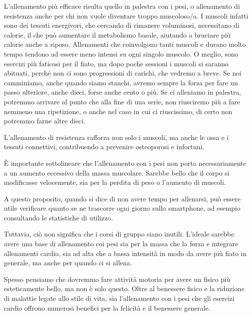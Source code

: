 \documentclass[12pt]{book} %
\begin{document}
\begin{itemize}
L'allenamento più efficace risulta quello in palestra con i pesi, o allenamento di resistenza anche per chi non vuole diventare troppo muscoloso/a.
I muscoli infatti sono dei tessuti energivori, che cercando di rimanere voluminosi, necessitano di calorie, il che può aumentare il metabolismo basale, aiutando a bruciare più calorie anche a riposo.
Allenamenti che coinvolgono tanti muscoli e durano molto tempo tendono ad essere meno intensi su ogni singolo muscolo. O meglio, sono esercizi più faticosi per il fiato, ma dopo poche sessioni i muscoli si saranno abituati, perché non ci sono progressioni di carichi, che vedremo a breve. Se noi camminiamo, anche quando siamo stanchi, avremo sempre la forza per fare un passo ulteriore, anche dieci, forse anche cento o più. Se ci alleniamo in palestra, potremmo arrivare al punto che alla fine di una serie, non riusciremo più a fare nemmeno una ripetizione, o anche nel caso in cui ci riuscissimo, di certo non potremmo farne altre dieci.

L'allenamento di resistenza rafforza non solo i muscoli, ma anche le ossa e i tessuti connettivi, contribuendo a prevenire osteoporosi e infortuni. 

È importante sottolineare che l'allenamento con i pesi non porta necessariamente a un aumento eccessivo della massa muscolare. Sarebbe bello che il corpo si modificasse velocemente, sia per la perdita di peso o l'aumento di muscoli.

A questo proposito, quando si dice di non avere tempo per allenarsi, può essere utile verificare quanto se ne trascorre ogni giorno sullo smartphone, ad esempio consultando le statistiche di utilizzo.

Tuttavia, ciò non significa che i corsi di gruppo siano inutili. L'ideale sarebbe avere una base di allenamento coi pesi sia per la massa che la forza e integrare allenamenti cardio, sia ad alta che a bassa intensità in modo da avere più fiato in generale, ma anche per quando ci si allena.

Spesso pensiamo che dovremmo fare attività motoria per avere un fisico più esteticamente bello, ma non è solo questo. Oltre al benessere fisico e la riduzione di malattie legate allo stile di vita, sia l'allenamento con i pesi che gli esercizi cardio offrono numerosi benefici per la felicità e il benessere generale.


\end{itemize}
\end{document}
